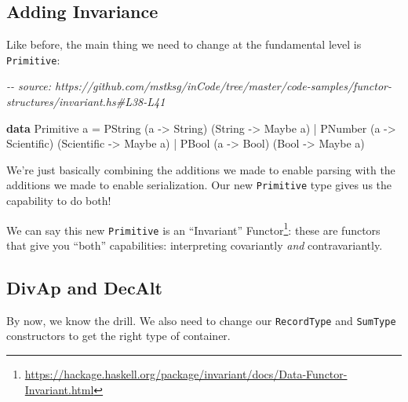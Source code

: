 \documentclass[]{article}
\newenvironment{Shaded}{}{}
\newcommand{\CommentTok}[1]{\textcolor[rgb]{0.38,0.63,0.69}{\textit{#1}}}
\newcommand{\DataTypeTok}[1]{\textcolor[rgb]{0.56,0.13,0.00}{#1}}
\newcommand{\KeywordTok}[1]{\textcolor[rgb]{0.00,0.44,0.13}{\textbf{#1}}}
\newcommand{\NormalTok}[1]{#1}
\newcommand{\OperatorTok}[1]{\textcolor[rgb]{0.40,0.40,0.40}{#1}}
\newcommand{\OtherTok}[1]{\textcolor[rgb]{0.00,0.44,0.13}{#1}}
\renewcommand{\href}[2]{#2\footnote{\url{#1}}}
\begin{document}
\hypertarget{adding-invariance}{%
\subsection{Adding Invariance}\label{adding-invariance}}

Like before, the main thing we need to change at the fundamental level is
\texttt{Primitive}:

\begin{Shaded}
\begin{Highlighting}[]
\CommentTok{{-}{-} source: https://github.com/mstksg/inCode/tree/master/code{-}samples/functor{-}structures/invariant.hs\#L38{-}L41}

\KeywordTok{data} \DataTypeTok{Primitive}\NormalTok{ a }\OtherTok{=}
      \DataTypeTok{PString}\NormalTok{ (a }\OtherTok{{-}>} \DataTypeTok{String}\NormalTok{)     (}\DataTypeTok{String}     \OtherTok{{-}>} \DataTypeTok{Maybe}\NormalTok{ a)}
    \OperatorTok{|} \DataTypeTok{PNumber}\NormalTok{ (a }\OtherTok{{-}>} \DataTypeTok{Scientific}\NormalTok{) (}\DataTypeTok{Scientific} \OtherTok{{-}>} \DataTypeTok{Maybe}\NormalTok{ a)}
    \OperatorTok{|} \DataTypeTok{PBool}\NormalTok{   (a }\OtherTok{{-}>} \DataTypeTok{Bool}\NormalTok{)       (}\DataTypeTok{Bool}       \OtherTok{{-}>} \DataTypeTok{Maybe}\NormalTok{ a)}
\end{Highlighting}
\end{Shaded}

We're just basically combining the additions we made to enable parsing with the
additions we made to enable serialization. Our new \texttt{Primitive} type gives
us the capability to do both!

We can say this new \texttt{Primitive} is an
\href{https://hackage.haskell.org/package/invariant/docs/Data-Functor-Invariant.html}{``Invariant''
Functor}: these are functors that give you ``both'' capabilities: interpreting
covariantly \emph{and} contravariantly.

\hypertarget{divap-and-decalt}{%
\subsection{DivAp and DecAlt}\label{divap-and-decalt}}

By now, we know the drill. We also need to change our \texttt{RecordType} and
\texttt{SumType} constructors to get the right type of container.
\end{document}
